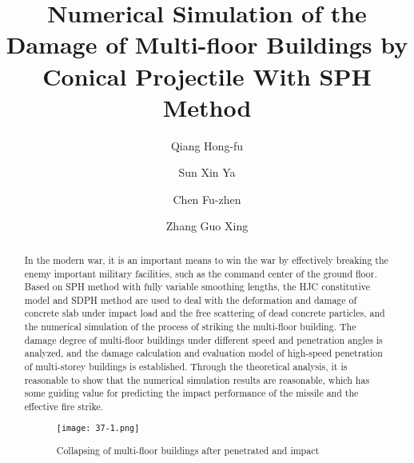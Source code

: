 \documentclass[10pt]{article}
\title{Numerical Simulation of the Damage of Multi-floor Buildings by Conical Projectile With SPH Method}
\date{}
\author[$\relax$]{Qiang Hong-fu}
\author[$\relax$]{Sun Xin Ya}
\author[$\relax$]{Chen Fu-zhen}
\author[$\relax$]{Zhang Guo Xing}
\affil[$\relax$]{Department of Power Engineering, Xi'an Hi-Tech Institute, China)}
\affil[$\relax$]{\email{}{1430167246@qq.com}}
\begin{document}
\maketitle


\begin{abstract}
In the modern war, it is an important means to win the war by effectively breaking the enemy important military facilities, such as the command center of the ground floor. Based on SPH method with fully variable smoothing lengths, the HJC constitutive model and SDPH method are used to deal with the deformation and damage of concrete slab under impact load and the free scattering of dead concrete particles, and the numerical simulation of the process of striking the multi-floor building. The damage degree of multi-floor buildings under different speed and penetration angles is analyzed, and the damage calculation and evaluation model of high-speed penetration of multi-storey buildings is established. Through the theoretical analysis, it is reasonable to show that the numerical simulation results are reasonable, which has some guiding value for predicting the impact performance of the missile and the effective fire strike.


\begin{figure}[!htb]
\centering
\texttt{[image: 37-1.png]}
\caption{Collapsing of multi-floor buildings after penetrated and impact}\label{fig:37}
\end{figure}

\end{abstract}



\addbib
\end{document}
